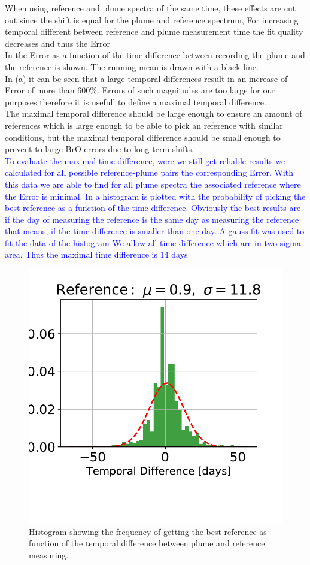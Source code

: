 \documentclass  [
  paper    = a4,
  BCOR     = 10mm,
  twoside,
  fontsize = 12pt,
  fleqn,
  toc      = bibnumbered,
  toc      = listofnumbered,
  numbers  = noendperiod,
  headings = normal,
  listof   = leveldown,
  version  = 3.03
]                                       {scrreprt}
\begin{document}
	When using reference and plume spectra of the same time, these effects are cut out since the shift is equal for the plume and reference spectrum, For increasing temporal different between reference and plume measurement time the fit quality decreases and thus the   Error\\
	In  the  Error as a function of the time difference between recording the plume and the reference is shown. The running mean is drawn with a black line. \\
	In  (a) it can be seen that a large temporal differences result in an increase of   Error of more than 600\%.   Errors of such magnitudes are too large for our purposes therefore it is usefull to define a maximal temporal difference.\\
	The maximal temporal difference should be large enough to ensure an amount of references which is large enough to be able to pick an reference with similar conditions, but the maximal temporal difference should be small enough to prevent to large BrO errors due to long term shifts.\\
	\textcolor{blue}{To evaluate the maximal time difference, were we still get reliable results we calculated for all possible reference-plume pairs the corresponding  Error. With this data we are able to find for all plume spectra the associated reference where the  Error is minimal. In  a histogram is plotted with the probability of picking the best reference as a function of the time difference. Obviously the best results are if the day of measuring the reference is the same day as measuring the reference that means, if the time difference is smaller than one day. A gauss fit was used to fit the data of the histogram We allow all time difference which are in two sigma area. Thus the maximal time difference is 14 days}\\
	\begin{figure}
\centering
\includegraphics[width=0.7\linewidth]{Bilder/Hist}
\caption{Histogram showing the frequency of getting the best reference as function of the temporal difference between plume and reference measuring.}
\label{fig:Hist}
\end{figure}
\end{document}

